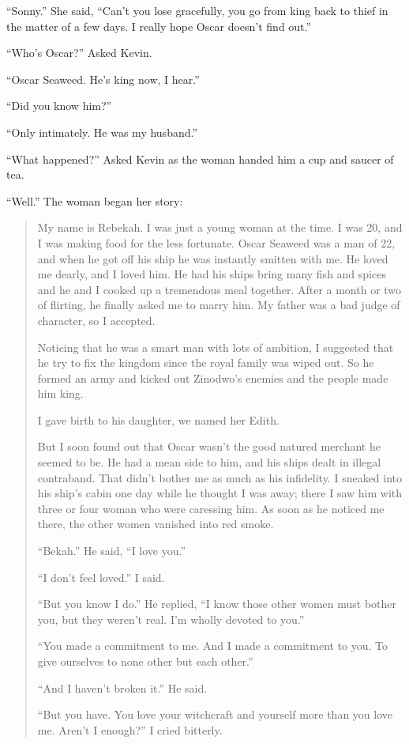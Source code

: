 ``Sonny.'' She said, ``Can't you lose gracefully, you go from king back to thief in the matter of a few days. I really hope Oscar doesn't find out.''

``Who's Oscar?'' Asked Kevin.

``Oscar Seaweed. He's king now, I hear.''

``Did you know him?''

``Only intimately. He was my husband.''

``What happened?'' Asked Kevin as the woman handed him a cup and saucer of tea.

``Well.'' The woman began her story:

\begin{quote}
My name is Rebekah. I was just a young woman at the time.
I was 20, and I was making food for the less fortunate.
Oscar Seaweed was a man of 22, and when he got off his ship he was instantly smitten with me.
He loved me dearly, and I loved him.
He had his ships bring many fish and spices and he and I cooked up a tremendous meal together.
After a month or two of flirting, he finally asked me to marry him. My father was a bad judge of character, so I accepted.

Noticing that he was a smart man with lots of ambition, I suggested that he try to fix the kingdom since the royal family was wiped out. So he formed an army and kicked out Zi\-no\-dwo's enemies and the people made him king.

I gave birth to his daughter, we named her Edith.

But I soon found out that Oscar wasn't the good natured merchant he seemed to be.
He had a mean side to him, and his ships dealt in illegal contraband.
That didn't bother me as much as his infidelity.
I sneaked into his ship's cabin one day while he thought I was away; there I saw him with three or four woman who were caressing him. As soon as he noticed me there, the other women vanished into red smoke.

``Bekah.'' He said, ``I love you.''

``I don't feel loved.'' I said.

``But you know I do.'' He replied, ``I know those other women must bother you, but they weren't real. I'm wholly devoted to you.''

``You made a commitment to me. And I made a commitment to you. To give ourselves to none other but each other.''

``And I haven't broken it.'' He said.

``But you have. You love your witchcraft and yourself more than you love me. Aren't I enough?'' I cried bitterly.

\end{quote}

